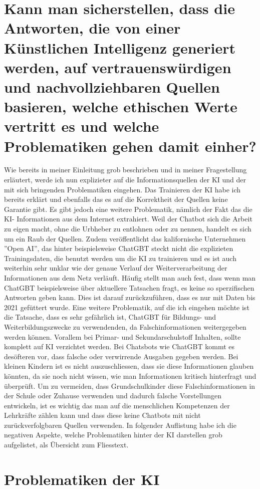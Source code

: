 \documentclass{report}
\begin{document}
\section{Kann man sicherstellen, dass die Antworten, die von einer Künstlichen Intelligenz generiert werden, auf vertrauenswürdigen und nachvollziehbaren Quellen basieren, welche ethischen Werte vertritt es und welche Problematiken gehen damit einher?}
Wie bereits in meiner Einleitung grob beschrieben und in meiner Fragestellung erläutert, werde ich nun explizieter auf die Informationsquellen der KI und der mit sich bringenden Problematiken eingehen. Das Trainieren der KI habe ich bereits erklärt und ebenfalls das es auf die Korrektheit der Quellen keine Garantie gibt. Es gibt jedoch eine weitere Problematik, nämlich der Fakt das die KI- Informationen aus dem Internet extrahiert. Weil der Chatbot sich die Arbeit zu eigen macht, ohne die Urbheber zu entlohnen oder zu nennen, handelt  es sich um ein Raub der Quellen. Zudem veröffentlicht das kalifornische Unternehmen ''Open AI'', das hinter beispielsweise ChatGBT steckt nicht die explizieten Trainingsdaten, die benutzt werden um die KI zu trainieren und es ist auch weiterhin sehr unklar wie der genaue Verlauf der Weiterverarbeitung der Informationen aus dem Netz verläuft. Häufig stellt man auch fest, dass wenn man ChatGBT beispielsweise über aktuellere Tatsachen fragt, es keine so sperzifischen Antworten geben kann. Dies ist darauf zurückzuführen, dass es nur mit Daten bis 2021 gefüttert wurde. Eine weitere Problematik, auf die ich eingehen möchte ist die Tatsache, dass es sehr gefährlich ist, ChatGBT für Bildungs- und Weiterbildungszwecke zu verwendenden, da Falschinformationen weitergegeben werden können. Vorallem bei Primar- und Sekundarschulstoff Inhalten, sollte komplett auf KI verzichtet werden. 
Bei Chatsbots wie ChatGBT kommt es desöfteren vor, dass falsche oder verwirrende Ausgaben gegeben werden. Bei kleinen Kindern ist es nicht auszuschliessen, dass sie diese Informationen glauben könnten, da sie noch nicht wissen, wie man Informationen kritisch hinterfragt und überprüft. Um zu vermeiden, dass Grundschulkinder diese Falschinformationen in der Schule oder Zuhause verwenden und dadurch falsche Vorstellungen entwickeln, ist es wichtig das man auf die menschlichen Kompetenzen der Lehrkräfte zählen kann und dass diese keine Chatbots mit nicht zurückverfolgbaren Quellen verwenden. In folgender Auflistung habe ich die negativen Aspekte, welche Problematiken hinter der KI darstellen grob aufgelistet, als Übersicht zum Fliesstext.
\section{Problematiken der KI}
\end{document}
